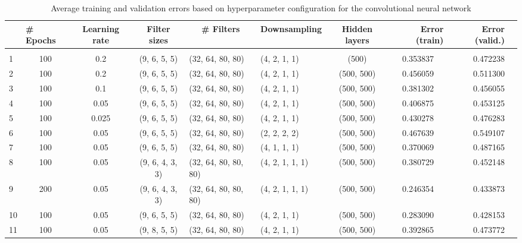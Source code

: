 \documentclass{acm_proc_article-sp}
\begin{document}
\begin{table}
\caption{Average training and validation errors based on hyperparameter configuration for the convolutional neural network}
\label{tab:convnet_params}
\begin{center}
\begin{adjustbox}{width=1\textwidth}
\begin{tabular}{lcccllcc|rr}

&\multicolumn{1}{l}{\bf \# Epochs}
&\multicolumn{1}{c}{\bf Learning rate}
&\multicolumn{1}{c}{\bf Filter sizes}
&\multicolumn{1}{c}{\bf \# Filters}
&\multicolumn{1}{c}{\bf Downsampling}
&\multicolumn{1}{c}{\bf Hidden layers}
&\multicolumn{1}{r}{\bf Error (train)}
&\multicolumn{1}{r}{\bf Error (valid.)}
\\ \hline \\	
1 & 100 & 0.2 & (9, 6, 5, 5) & (32, 64, 80, 80) & (4, 2, 1, 1) & (500) & 0.353837 & 0.472238 \\
2 & 100 & 0.2 & (9, 6, 5, 5) & (32, 64, 80, 80) & (4, 2, 1, 1) & (500, 500) & 0.456059 & 0.511300 \\
3 & 100 & 0.1 & (9, 6, 5, 5) & (32, 64, 80, 80) & (4, 2, 1, 1) & (500, 500) & 0.381302 & 0.456055 \\
4 & 100 & 0.05 & (9, 6, 5, 5) & (32, 64, 80, 80) & (4, 2, 1, 1) & (500, 500) & 0.406875 & 0.453125 \\
5 & 100 & 0.025 & (9, 6, 5, 5) & (32, 64, 80, 80) & (4, 2, 1, 1) & (500, 500) & 0.430278 & 0.476283 \\
6 & 100 & 0.05 & (9, 6, 5, 5) & (32, 64, 80, 80) & (2, 2, 2, 2) & (500, 500) & 0.467639 & 0.549107 \\
7 & 100 & 0.05 & (9, 6, 5, 5) & (32, 64, 80, 80) & (4, 1, 1, 1) & (500, 500) & 0.370069 & 0.487165 \\
8 & 100 & 0.05 & (9, 6, 4, 3, 3) & (32, 64, 80, 80, 80) & (4, 2, 1, 1, 1) & (500, 500) & 0.380729 & 0.452148 \\
9 & 200 & 0.05 & (9, 6, 4, 3, 3) & (32, 64, 80, 80, 80) & (4, 2, 1, 1, 1) & (500, 500) & 0.246354 & 0.433873 \\
10 & 100 & 0.05 & (9, 6, 5, 5) & (32, 64, 80, 80) & (4, 2, 1, 1) & (500, 500) & 0.283090 & 0.428153 \\
11 & 100 & 0.05 & (9, 8, 5, 5) & (32, 64, 80, 80) & (4, 2, 1, 1) & (500, 500) & 0.392865 & 0.473772 
\end{tabular}
\end{adjustbox}
\end{center}
\end{table}


\balancecolumns
\end{document}
